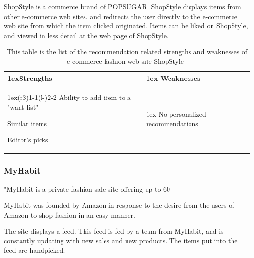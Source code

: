     ShopStyle is a commerce brand of POPSUGAR.
    ShopStyle displays items from other e-commerce web sites, and redirects the user directly to the e-commerce web site from which the item clicked originated.
    Items can be liked on ShopStyle, and viewed in less detail at the web page of ShopStyle.
    \begin{table}[H]
                    \centering
                    \begin{tabularx}{\linewidth}{>{\parskip1ex}X@{\kern4\tabcolsep}>{\parskip1ex}X}
                    \toprule
                    \hfil\bfseries Strengths
                    &
                    \hfil\bfseries Weaknesses
                    \\\cmidrule(r{3\tabcolsep}){1-1}\cmidrule(l{-\tabcolsep}){2-2}
                Ability to add item to a "want list" \par
                Similar items \par
                Editor's picks \par
            & 
                No personalized recommendations \par
            \\ \bottomrule
        \end{tabularx}
        \caption[Recommendation related strengths and weaknesses of ShopStyle~\cite{ShopStyle}]{This table is the list of the recommendation related strengths and weaknesses of e-commerce fashion web site ShopStyle~\cite{ShopStyle}}
        \label{table:ecommenreceShopStyle}
    \end{table}

\subsubsection{MyHabit} %
\label{par:myhabit}
    "MyHabit is a private fashion sale site offering up to 60%

    MyHabit was founded by Amazon in response to the desire from the users of Amazon to shop fashion in an easy manner.

    The site displays a feed.
    This feed is fed by a team from MyHabit, and is constantly updating with new sales and new products.
    The items put into the feed are handpicked.

